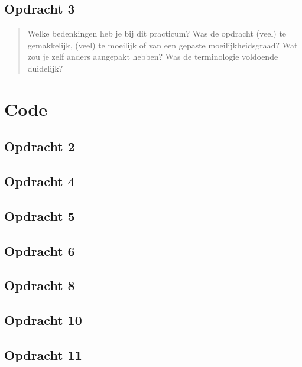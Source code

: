 \documentclass[11pt, a4paper, titlepage, openright]{article}
\begin{document}
	\subsection{Opdracht 3}
		\begin{quote}
			Welke bedenkingen heb je bij dit practicum? Was de opdracht (veel) te gemakkelijk, (veel) te moeilijk of
			van een gepaste moeilijkheidsgraad? Wat zou je zelf anders aangepakt hebben?  Was de terminologie voldoende duidelijk?
		\end{quote}




\onecolumn
\appendix
\appendixpage
\addappheadtotoc

\section{Code}
	\subsection{Opdracht 2}
		
	\subsection{Opdracht 4}
    \label{appendix:ex4}
		
    \subsection{Opdracht 5}
        
    \subsection{Opdracht 6}
        
    \subsection{Opdracht 8}
        
	\subsection{Opdracht 10}
		
	\subsection{Opdracht 11}
		
\end{document}
